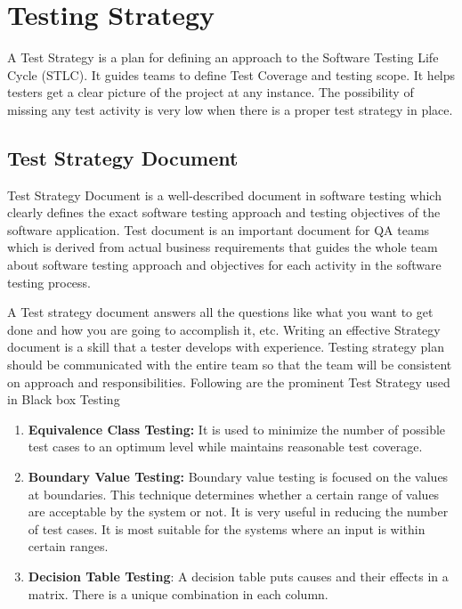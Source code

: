 \section{Testing Strategy}

A Test Strategy is a plan for defining an approach to the Software Testing Life Cycle (STLC). It guides teams to define Test Coverage and testing scope. It helps testers get a clear picture of the project at any instance. The possibility of missing any test activity is very low when there is a proper test strategy in place.

\subsection{Test Strategy Document}
Test Strategy Document is a well-described document in software testing which clearly defines the exact software testing approach and testing objectives of the software application. Test document is an important document for QA teams which is derived from actual business requirements that guides the whole team about software testing approach and objectives for each activity in the software testing process.

A Test strategy document answers all the questions like what you want to get done and how you are going to accomplish it, etc. Writing an effective Strategy document is a skill that a tester develops with experience. Testing strategy plan should be communicated with the entire team so that the team will be consistent on approach and responsibilities.\newline
Following are the prominent Test Strategy used in Black box Testing
\begin{enumerate}
	\item \textbf{Equivalence Class Testing:} It is used to minimize the number of possible test cases to an optimum level while maintains reasonable test coverage.
	\item \textbf{Boundary Value Testing:} Boundary value testing is focused on the values at boundaries. This technique determines whether a certain range of values are acceptable by the system or not. It is very useful in reducing the number of test cases. It is most suitable for the systems where an input is within certain ranges.
	\item \textbf{Decision Table Testing}: A decision table puts causes and their effects in a matrix. There is a unique combination in each column.
	
\end{enumerate}

